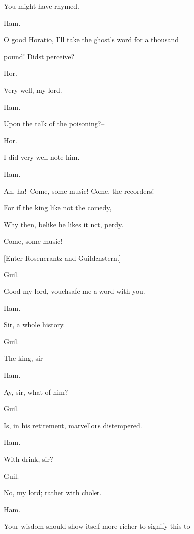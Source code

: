 \documentclass[12pt]{book}
\begin{document}
You might have rhymed.



Ham.

O good Horatio, I'll take the ghost's word for a thousand

pound! Didst perceive?



Hor.

Very well, my lord.



Ham.

Upon the talk of the poisoning?--



Hor.

I did very well note him.



Ham.

Ah, ha!--Come, some music! Come, the recorders!--

   For if the king like not the comedy,

   Why then, belike he likes it not, perdy.

Come, some music!



[Enter Rosencrantz and Guildenstern.]



Guil.

Good my lord, vouchsafe me a word with you.



Ham.

Sir, a whole history.



Guil.

The king, sir--



Ham.

Ay, sir, what of him?



Guil.

Is, in his retirement, marvellous distempered.



Ham.

With drink, sir?



Guil.

No, my lord; rather with choler.



Ham.

Your wisdom should show itself more richer to signify this to
\end{document}
